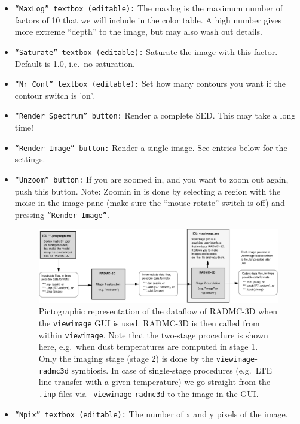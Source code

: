 \documentclass{report}
\begin{document}
\begin{itemize}
\item {\small\tt ``MaxLog'' textbox (editable):} The maxlog is the maximum number of factors of
  10 that we will include in the color table. A high number gives more
  extreme ``depth'' to the image, but may also wash out details.
\item {\small\tt ``Saturate'' textbox (editable):} Saturate the image with this
  factor. Default is 1.0, i.e.\ no saturation.
\item {\small\tt ``Nr Cont'' textbox (editable):} Set how many contours you want
  if the contour switch is 'on'.
\item {\small\tt ``Render Spectrum'' button:} Render a complete SED. This may take
  a long time!
\item {\small\tt ``Render Image'' button:} Render a single image. See entries below
  for the settings.
\item {\small\tt ``Unzoom'' button:} If you are zoomed in, and you want to zoom out
again, push this button. Note: Zoomin in is done by selecting a region with the
moise in the image pane (make sure the ``mouse rotate'' switch is off) and
pressing {\small\tt ``Render Image''}. 
%
\begin{figure}
\centerline{\includegraphics[height=0.32\textwidth]{dataflow_viewimage_twostage.eps}}
\caption{\label{fig-dataflow-viewimage-twostage} Pictographic representation
  of the dataflow of RADMC-3D when the {\small\tt viewimage} GUI is
  used. RADMC-3D is then called from within {\small\tt viewimage}.  Note
  that the two-stage procedure is shown here, e.g.\ when dust temperatures
  are computed in stage 1. Only the imaging stage (stage 2) is done by the
  {\small\tt viewimage}-{\small\tt radmc3d} symbiosis. In case of
  single-stage procedures (e.g.\ LTE line transfer with a given temperature)
  we go straight from the {\small\tt .inp} files via {\small\tt
    viewimage}-{\small\tt radmc3d} to the image in the GUI.}
\end{figure}
%
\item {\small\tt ``Npix'' textbox (editable):} The number of x and y pixels of the
  image.

\end{itemize}
\end{document}
